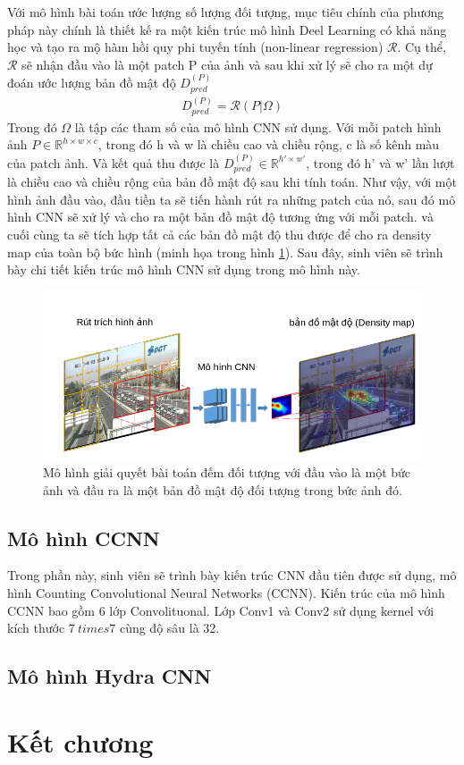 	Với mô hình bài toán ước lượng số lượng đối tượng, mục tiêu chính của phương pháp này chính là thiết kế ra một kiến trúc mô hình Deel Learning có khả năng học và tạo ra mộ hàm hồi quy phi tuyến tính (non-linear regression) $\mathcal{R}$. Cụ thể, $\mathcal{R}$ sẽ nhận đầu vào là một patch P của ảnh và sau khi xử lý sẽ cho ra một dự đoán ước lượng bản đồ mật độ $D_{pred}^{(P)}$
\begin{align}
   D_{pred}^{(P)} = \mathcal{R}(P|\Omega)
\end{align}
	Trong đó $\Omega$ là tập các tham số của mô hình CNN sử dụng. Với mỗi patch hình ảnh $P \in \mathbb{R} ^ { h \times w \times c}$, trong đó h và w là chiều cao và chiều rộng, c là số kênh màu của patch ảnh. Và kết quả thu được là $D_{pred}^{(P)} \in \mathbb{R} ^ { h' \times w'} $, trong đó h' và w' lần lượt là chiều cao và chiều rộng của bản đồ mật độ sau khi tính toán. Như vậy, với một hình ảnh đầu vào, đầu tiền ta sẽ tiến hành rút ra những patch của nó, sau đó mô hình CNN sẽ xử lý và cho ra một bản đồ mật độ tương ứng với mỗi patch. và cuối cùng ta sẽ tích hợp tất cả các bản đồ mật độ thu được để cho ra density map của toàn bộ bức hình (minh họa trong hình \ref{mohinh}). Sau đây, sinh viên sẽ trình bày chi tiết kiến trúc mô hình CNN sử dụng trong mô hình này.
	
\begin{figure}[ht]
  			\begin{center}
    				\includegraphics[scale=0.5]{mohinh} 
    				\caption{Mô hình giải quyết bài toán đếm đối tượng với đầu vào là một bức ảnh và đầu ra là một bản đồ mật độ đối tượng trong bức ảnh đó.} 
    				\label{mohinh}
  			\end{center}
\end{figure}	




\subsection{Mô hình CCNN}
	Trong phần này, sinh viên sẽ trình bày kiến trúc CNN đầu tiên được sử dụng, mô hình Counting Convolutional Neural Networks (CCNN). Kiến trúc của mô hình CCNN bao gồm 6 lớp Convolituonal. Lớp Conv1 và Conv2 sử dụng kernel với kích thước $7 \ times 7$ cùng độ sâu là 32. 
\subsection{Mô hình Hydra CNN}
\section{Kết chương}


